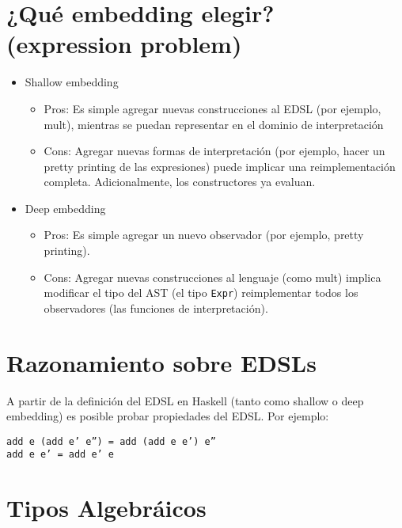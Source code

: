 \documentclass{article}
\newcommand{\imp}[1]{\textcolor{color1}{#1}}
\begin{document}
\section{¿Qué embedding elegir? (expression problem)}\label{sec:expression_problem}


\begin{itemize}
\item[] \imp{Shallow embedding}
\begin{itemize}
\item[] \imp{Pros}: Es simple agregar nuevas construcciones al EDSL (por ejemplo, mult), mientras se puedan representar en el dominio de interpretación
\item[] \imp{Cons}: Agregar nuevas formas de interpretación (por ejemplo, hacer un pretty printing de las expresiones) puede implicar una reimplementación completa. Adicionalmente, los constructores ya evaluan.
\end{itemize}
\item[] \imp{Deep embedding}
\begin{itemize}
\item[] \imp{Pros}: Es simple agregar un nuevo observador (por ejemplo, pretty printing).
\item[] \imp{Cons}: Agregar nuevas construcciones al lenguaje (como mult) implica modificar el tipo del AST (el tipo \texttt{Expr})  reimplementar todos los observadores (las funciones de interpretación).
\end{itemize}
\end{itemize}

\section{Razonamiento sobre EDSLs}\label{sec:razonamiento_sobre_edsls}

\noindent A partir de la definición del EDSL en Haskell (tanto como shallow o deep embedding) es posible probar propiedades del EDSL. Por ejemplo:
\begin{center}
\texttt{add e (add e' e'') = add (add e e') e''} \\
\texttt{add e e' = add e' e}
\end{center}

\newpage

\section{Tipos Algebráicos}\label{sec:tipos_algebraicos}
\end{document}

